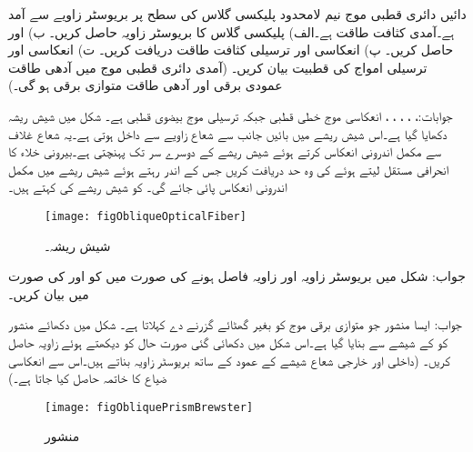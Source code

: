 
دائیں دائری قطبی موج  نیم لامحدود پلیکسی گلاس   کی سطح پر بریوسٹر زاویے سے آمد ہے۔آمدی کثافت طاقت  ہے۔الف) پلیکسی گلاس کا بریوسٹر زاویہ حاصل کریں۔ ب)  اور  حاصل کریں۔ پ) انعکاسی اور ترسیلی کثافت طاقت دریافت کریں۔ ت) انعکاسی اور ترسیلی امواج کی قطبیت بیان کریں۔ (آمدی دائری قطبی موج میں آدھی طاقت عمودی برقی اور آدھی طاقت متوازی برقی ہو گی۔)

جوابات:، ، ، ، ، انعکاسی موج خطی قطبی جبکہ ترسیلی موج بیضوی قطبی ہے۔
شکل  میں شیش ریشہ دکھایا گیا ہے۔اس شیش ریشے میں بائیں جانب سے شعاع  زاویے سے داخل ہوتی ہے۔یہ شعاع غلاف سے مکمل اندرونی انعکاس کرتے ہوئے شیش ریشے کے دوسرے سر تک پہنچتی ہے۔بیرونی خلاء کا انحرافی مستقل  لیتے ہوئے  کی وہ حد دریافت کریں جس کے اندر رہتے ہوئے  شیش ریشے میں مکمل اندرونی انعکاس پائی جائے گی۔ کو شیش ریشے کی  کہتے ہیں۔   
\begin{figure}
\centering
\texttt{[image: figObliqueOpticalFiber]}
\caption{شیش ریشہ۔}
\label{شکل_ترچھی_شیش_ریشہ}
\end{figure}

جواب:
شکل  میں  بریوسٹر زاویہ اور  زاویہ فاصل ہونے کی صورت میں  کو  اور  کی صورت میں بیان کریں۔

جواب:
ایسا منشور جو  متوازی برقی موج کو بغیر گھٹائے گزرنے دے  کہلاتا ہے۔ شکل  میں دکھائے منشور کو  کے شیشے سے بنایا گیا ہے۔اس شکل میں دکھائی گئی صورت حال کو دیکھتے ہوئے زاویہ  حاصل کریں۔ (داخلی اور خارجی شعاع شیشے کے عمود کے ساتھ بریوسٹر زاویہ بناتے ہیں۔اس سے انعکاسی ضیاع کا خاتمہ حاصل کیا جاتا ہے۔)
\begin{figure}
\centering
\texttt{[image: figObliquePrismBrewster]}
\caption{منشور}
\label{شکل_ترچھی_منشور}
\end{figure}

